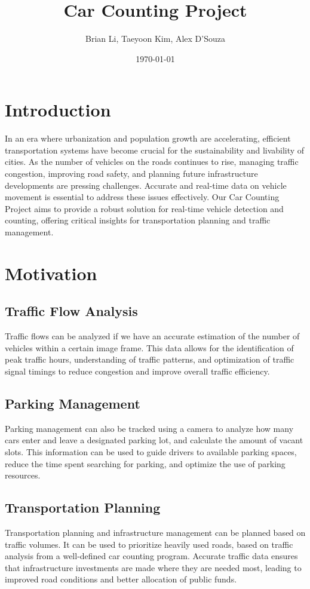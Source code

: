 \documentclass{article}
\begin{document}
\title{Car Counting Project}
\author{Brian Li, Taeyoon Kim, Alex D'Souza}
\date{\today}
\maketitle

\section{Introduction}
In an era where urbanization and population growth are accelerating, efficient transportation systems have become crucial for the sustainability and livability of cities. As the number of vehicles on the roads continues to rise, managing traffic congestion, improving road safety, and planning future infrastructure developments are pressing challenges. Accurate and real-time data on vehicle movement is essential to address these issues effectively. Our Car Counting Project aims to provide a robust solution for real-time vehicle detection and counting, offering critical insights for transportation planning and traffic management.

\section{Motivation}
\subsection{Traffic Flow Analysis}
Traffic flows can be analyzed if we have an accurate estimation of the number of vehicles within a certain image frame. This data allows for the identification of peak traffic hours, understanding of traffic patterns, and optimization of traffic signal timings to reduce congestion and improve overall traffic efficiency.

\subsection{Parking Management}
Parking management can also be tracked using a camera to analyze how many cars enter and leave a designated parking lot, and calculate the amount of vacant slots. This information can be used to guide drivers to available parking spaces, reduce the time spent searching for parking, and optimize the use of parking resources.

\subsection{Transportation Planning}
Transportation planning and infrastructure management can be planned based on traffic volumes. It can be used to prioritize heavily used roads, based on traffic analysis from a well-defined car counting program. Accurate traffic data ensures that infrastructure investments are made where they are needed most, leading to improved road conditions and better allocation of public funds.
\end{document}

